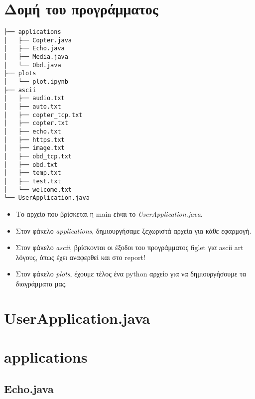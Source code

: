 \documentclass[hidelinks, 12pt, a4paper]{article}
\begin{document}
\sloppy %




\pagebreak
\tableofcontents
\pagebreak


\section{Δομή του προγράμματος}

\vspace{1cm}

\begin{verbatim}
├── applications
│   ├── Copter.java
│   ├── Echo.java
│   ├── Media.java
│   └── Obd.java
├── plots
│   └── plot.ipynb
├── ascii
│   ├── audio.txt
│   ├── auto.txt
│   ├── copter_tcp.txt
│   ├── copter.txt
│   ├── echo.txt
│   ├── https.txt
│   ├── image.txt
│   ├── obd_tcp.txt
│   ├── obd.txt
│   ├── temp.txt
│   ├── test.txt
│   └── welcome.txt
└── UserApplication.java
\end{verbatim}


\begin{itemize}
    \item Το αρχείο που βρίσκεται η main είναι το \emph{UserApplication.java}.
    \item Στον φάκελο \emph{applications}, δημιουργήσαμε ξεχωριστά αρχεία για κάθε εφαρμογή.
    \item Στον φάκελο \emph{ascii}, βρίσκονται οι έξοδοι του προγράμματος figlet για ascii art λόγους, όπως έχει αναφερθεί και στο report!
    \item Στον φάκελο \emph{plots}, έχουμε τέλος ένα python αρχείο για να δημιουργήσουμε τα διαγράμματα μας.
\end{itemize}


\pagebreak

\section{UserApplication.java}



\section{applications}

\subsection{Echo.java}
\end{document}
